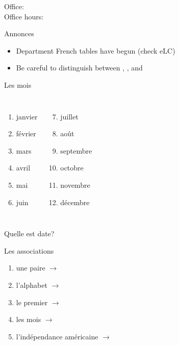 \documentclass{beamer}
\subtitle[Dates]{Les dates importantes}
\begin{document}
  \begin{frame}
    \titlepage
    \tiny{Office: \\
          Office hours: }
  \end{frame}

  \begin{frame}{Annonces }
    \begin{itemize}
      \item Department French tables have begun (check eLC)
      \item Be careful to distinguish between , , and 
    \end{itemize}
  \end{frame}

  \begin{frame}{Les mois}
    \begin{columns}
        \begin{enumerate}
          \item janvier
          \item février
          \item mars
          \item avril
          \item mai
          \item juin
        \end{enumerate}
        \begin{enumerate}
          \setcounter{enumi}{6}
          \item juillet
          \item août
          \item septembre
          \item octobre
          \item novembre
          \item décembre
        \end{enumerate}
    \end{columns}
    \vspace{1cm}
    Quelle est date? \underline{}
  \end{frame}

  \begin{frame}{Les associations}
    \begin{enumerate}
      \item une paire $\to$ \underline{}
      \item l'alphabet $\to$ \underline{}
      \item le premier $\to$ \underline{}
      \item les mois $\to$ \underline{}
      \item l'indépendance américaine $\to$ \underline{}
    \end{enumerate}
  \end{frame}
\end{document}
